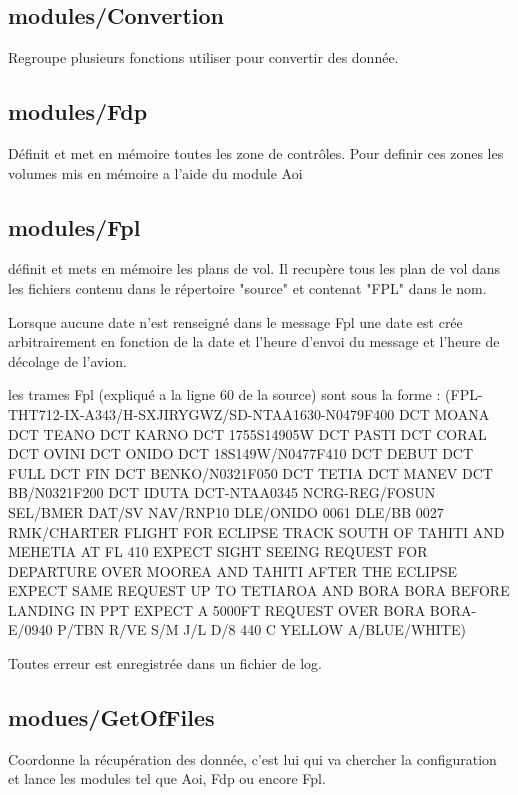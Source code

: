     \subsection{modules/Convertion\label{pyConvertion}} 
Regroupe plusieurs fonctions utiliser pour convertir des donnée.
\newpage

    \subsection{modules/Fdp\label{pyFdp}}
Définit et met en mémoire toutes les zone de contrôles. Pour definir ces zones les volumes mis en mémoire a l'aide du module Aoi 
\newpage

    \subsection{modules/Fpl\label{pyFpl}}
définit et mets en mémoire les plans de vol. Il recupère tous les plan de vol dans les fichiers contenu dans le répertoire "source" et contenat "FPL" dans le nom.

Lorsque aucune date n'est renseigné dans le message Fpl une date est crée arbitrairement en fonction de la date et l'heure d'envoi du message et l'heure de décolage de l'avion.

les trames Fpl (expliqué a la ligne 60 de la source) sont sous la forme : \newline
(FPL-THT712-IX-A343/H-SXJIRYGWZ/SD-NTAA1630-N0479F400 DCT MOANA DCT TEANO DCT KARNO DCT 1755S14905W DCT PASTI DCT CORAL DCT OVINI DCT ONIDO DCT 18S149W/N0477F410 DCT DEBUT DCT FULL DCT FIN DCT BENKO/N0321F050 DCT TETIA DCT MANEV DCT BB/N0321F200 DCT IDUTA DCT-NTAA0345 NCRG-REG/FOSUN SEL/BMER DAT/SV NAV/RNP10 DLE/ONIDO 0061 DLE/BB 0027 RMK/CHARTER FLIGHT FOR ECLIPSE TRACK SOUTH OF TAHITI AND MEHETIA AT FL 410 EXPECT SIGHT SEEING REQUEST FOR DEPARTURE OVER MOOREA AND TAHITI AFTER THE ECLIPSE EXPECT SAME REQUEST UP TO TETIAROA AND BORA BORA BEFORE LANDING IN PPT EXPECT A 5000FT REQUEST OVER BORA BORA-E/0940 P/TBN R/VE S/M J/L D/8 440 C YELLOW A/BLUE/WHITE)

Toutes erreur est enregistrée dans un fichier de log.
\newpage

    \subsection{modues/GetOfFiles\label{pyGOF}} 
Coordonne la récupération des donnée, c'est lui qui va chercher la configuration et lance les modules tel que Aoi, Fdp ou encore Fpl. 
\newpage

